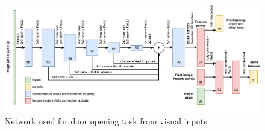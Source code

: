 \begin{figure}[h]
    \centering
    \includegraphics[width = 1.0\textwidth]{res/gps-net.pdf}
    \caption{Network used for door opening task from visual inputs \cite{chebotar2016path}}
    \label{fig:gps_net}
\end{figure}

%
%
%
%
%
